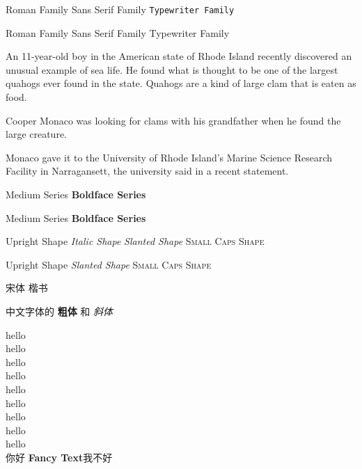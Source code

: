 \documentclass[12pt]{article}%
\newcommand{\myfont}{\textbf{\textsf{Fancy Text}}}
\begin{document}
	\textrm{Roman Family} %
	\textsf{Sans Serif Family}%
	\texttt{Typewriter Family}%
	
	\rmfamily Roman Family {\sffamily Sans Serif Family} {\ttfamily Typewriter Family}
	
	{\rmfamily An 11-year-old boy in the American state of Rhode Island recently discovered an unusual example of sea life. He found what is thought to be one of the largest quahogs ever found in the state. Quahogs are a kind of large clam that is eaten as food.}
	
	{\sffamily Cooper Monaco was looking for clams with his grandfather when he found the large creature.}
	
	 {\ttfamily Monaco gave it to the University of Rhode Island's Marine Science Research Facility in Narragansett, the university said in a recent statement.}
	
	\textmd{Medium Series} \textbf{Boldface Series}
	
	{\mdseries Medium Series} {\bfseries Boldface Series}


	\textup{Upright Shape} \textit{Italic Shape}
	\textsl{Slanted Shape} \textsc{Small Caps Shape}
	
	{\upshape Upright Shape} {\itshape }
	{\slshape Slanted Shape} {\scshape Small Caps Shape}
	
	
	{\songti 宋体}   \quad
	{\kaishu 楷书}
	
	中文字体的 \textbf{粗体} 和 \textit{斜体} %
	
	
	{\tiny hello} \\
	{\scriptsize hello} \\
	{\small hello} \\
	{\normalsize hello} \\
	{\large hello} \\
	{\Large hello} \\
	{\LARGE hello} \\
	{\huge hello} \\
	{\Huge hello} \\
	
	 你好
	\myfont 我不好
\end{document}
